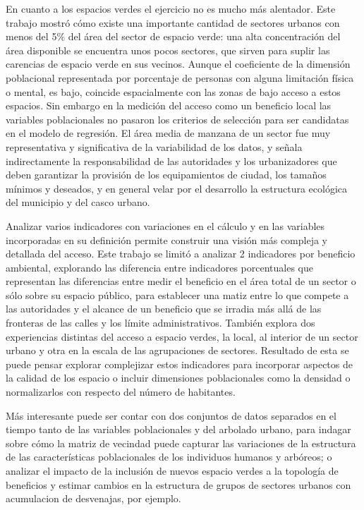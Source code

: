 \documentclass[12pt,]{book}
\begin{document}
En cuanto a los espacios verdes el ejercicio no es mucho más alentador.
Este trabajo mostró cómo existe una importante cantidad de sectores
urbanos con menos del 5\% del área del sector de espacio verde: una alta
concentración del área disponible se encuentra unos pocos sectores, que
sirven para suplir las carencias de espacio verde en sus vecinos. Aunque
el coeficiente de la dimensión poblacional representada por porcentaje
de personas con alguna limitación física o mental, es bajo, coincide
espacialmente con las zonas de bajo acceso a estos espacios. Sin embargo
en la medición del acceso como un beneficio local las variables
poblacionales no pasaron los criterios de selección para ser candidatas
en el modelo de regresión. El área media de manzana de un sector fue muy
representativa y significativa de la variabilidad de los datos, y señala
indirectamente la responsabilidad de las autoridades y los urbanizadores
que deben garantizar la provisión de los equipamientos de ciudad, los
tamaños mínimos y deseados, y en general velar por el desarrollo la
estructura ecológica del municipio y del casco urbano.

Analizar varios indicadores con variaciones en el cálculo y en las
variables incorporadas en su definición permite construir una visión más
compleja y detallada del acceso. Este trabajo se limitó a analizar 2
indicadores por beneficio ambiental, explorando las diferencia entre
indicadores porcentuales que representan las diferencias entre medir el
beneficio en el área total de un sector o sólo sobre su espacio público,
para establecer una matiz entre lo que compete a las autoridades y el
alcance de un beneficio que se irradia más allá de las fronteras de las
calles y los límite administrativos. También explora dos experiencias
distintas del acceso a espacio verdes, la local, al interior de un
sector urbano y otra en la escala de las agrupaciones de sectores.
Resultado de esta se puede pensar explorar complejizar estos indicadores
para incorporar aspectos de la calidad de los espacio o incluir
dimensiones poblacionales como la densidad o normalizarlos con respecto
del número de habitantes.

Más interesante puede ser contar con dos conjuntos de datos separados en
el tiempo tanto de las variables poblacionales y del arbolado urbano,
para indagar sobre cómo la matriz de vecindad puede capturar las
variaciones de la estructura de las características poblacionales de los
individuos humanos y arbóreos; o analizar el impacto de la inclusión de
nuevos espacio verdes a la topología de beneficios y estimar cambios en
la estructura de grupos de sectores urbanos con acumulacion de
desvenajas, por ejemplo.
\end{document}
